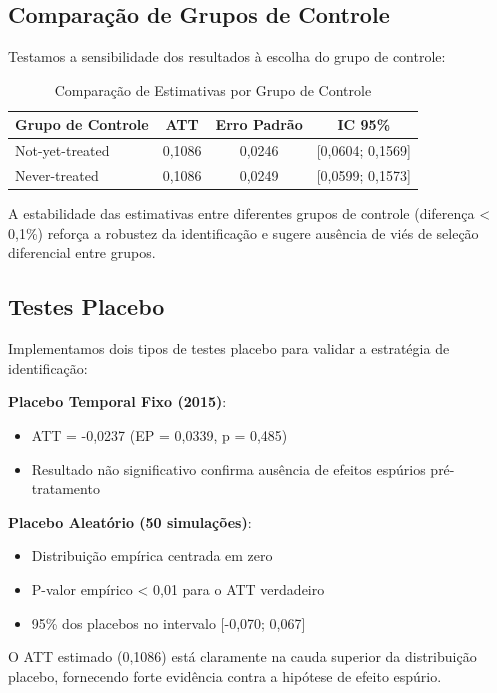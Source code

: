 \documentclass[
	12pt,				%
	openright,			%
	oneside,			%
	a4paper,			%
	english,			%
	french,				%
	spanish,			%
	brazil				%
	]{abntex2}
\begin{document}
\subsection{Comparação de Grupos de Controle}

Testamos a sensibilidade dos resultados à escolha do grupo de controle:

\begin{table}[htbp]
\centering
\caption{Comparação de Estimativas por Grupo de Controle}
\label{tab:controle}
\begin{tabular}{lccc}
\toprule
Grupo de Controle & ATT & Erro Padrão & IC 95\% \\
\midrule
Not-yet-treated & 0,1086 & 0,0246 & [0,0604; 0,1569] \\
Never-treated & 0,1086 & 0,0249 & [0,0599; 0,1573] \\
\bottomrule
\end{tabular}
\end{table}

A estabilidade das estimativas entre diferentes grupos de controle (diferença < 0,1\%) reforça a robustez da identificação e sugere ausência de viés de seleção diferencial entre grupos.

\subsection{Testes Placebo}

Implementamos dois tipos de testes placebo para validar a estratégia de identificação:

\textbf{Placebo Temporal Fixo (2015)}:
\begin{itemize}
\item ATT = -0,0237 (EP = 0,0339, p = 0,485)
\item Resultado não significativo confirma ausência de efeitos espúrios pré-tratamento
\end{itemize}

\textbf{Placebo Aleatório (50 simulações)}:
\begin{itemize}
\item Distribuição empírica centrada em zero
\item P-valor empírico < 0,01 para o ATT verdadeiro
\item 95\% dos placebos no intervalo [-0,070; 0,067]
\end{itemize}

O ATT estimado (0,1086) está claramente na cauda superior da distribuição placebo, fornecendo forte evidência contra a hipótese de efeito espúrio.
\end{document}
